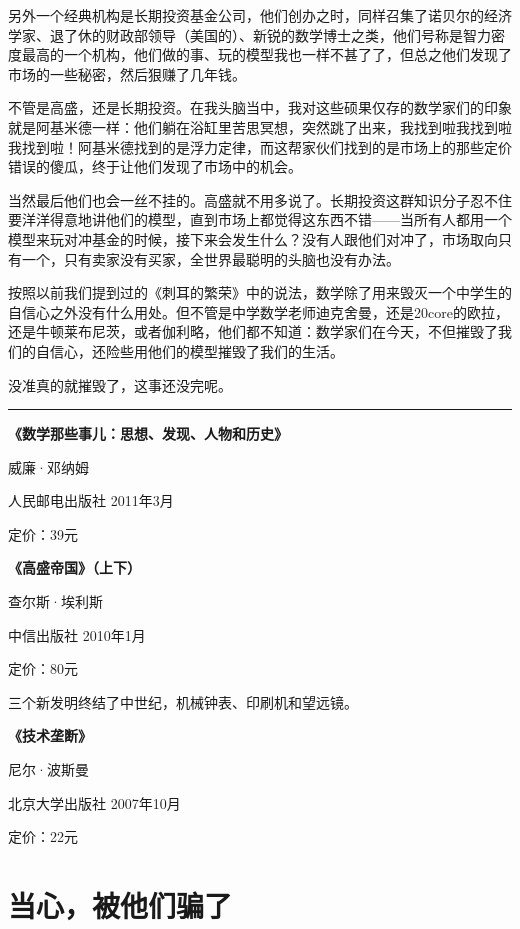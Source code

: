 另外一个经典机构是长期投资基金公司，他们创办之时，同样召集了诺贝尔的经济学家、退了休的财政部领导（美国的）、新锐的数学博士之类，他们号称是智力密度最高的一个机构，他们做的事、玩的模型我也一样不甚了了，但总之他们发现了市场的一些秘密，然后狠赚了几年钱。

不管是高盛，还是长期投资。在我头脑当中，我对这些硕果仅存的数学家们的印象就是阿基米德一样：他们躺在浴缸里苦思冥想，突然跳了出来，我找到啦我找到啦我找到啦！阿基米德找到的是浮力定律，而这帮家伙们找到的是市场上的那些定价错误的傻瓜，终于让他们发现了市场中的机会。

当然最后他们也会一丝不挂的。高盛就不用多说了。长期投资这群知识分子忍不住要洋洋得意地讲他们的模型，直到市场上都觉得这东西不错------当所有人都用一个模型来玩对冲基金的时候，接下来会发生什么？没有人跟他们对冲了，市场取向只有一个，只有卖家没有买家，全世界最聪明的头脑也没有办法。

按照以前我们提到过的《刺耳的繁荣》中的说法，数学除了用来毁灭一个中学生的自信心之外没有什么用处。但不管是中学数学老师迪克舍曼，还是20core的欧拉，还是牛顿莱布尼茨，或者伽利略，他们都不知道：数学家们在今天，不但摧毁了我们的自信心，还险些用他们的模型摧毁了我们的生活。

没准真的就摧毁了，这事还没完呢。

\begin{center}\rule{0.5\linewidth}{0.5pt}\end{center}

\textbf{《数学那些事儿：思想、发现、人物和历史》}

威廉·邓纳姆

人民邮电出版社 2011年3月

定价：39元

\textbf{《高盛帝国》（上下）}

查尔斯·埃利斯

中信出版社 2010年1月

定价：80元

三个新发明终结了中世纪，机械钟表、印刷机和望远镜。

\textbf{《技术垄断》}

尼尔·波斯曼

北京大学出版社 2007年10月

定价：22元

\hypertarget{ux5f53ux5fc3ux88abux4ed6ux4eecux9a97ux4e86}{%
\section{当心，被他们骗了}\label{ux5f53ux5fc3ux88abux4ed6ux4eecux9a97ux4e86}}

